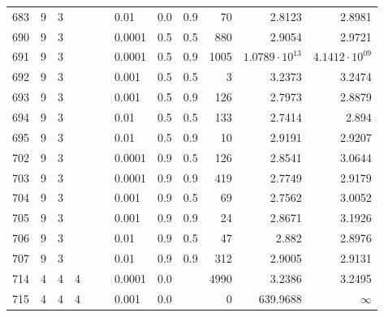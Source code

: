 \begin{longtable}{lrrrrrlrrrrr}
  683 &       9 & 3 &   &   &   &                        0.01 &      0.0 &    0.9 &      70 &                 2.8123 &                 2.8981 \\
  690 &       9 & 3 &   &   &   &                      0.0001 &      0.5 &    0.5 &     880 &                 2.9054 &                 2.9721 \\
  691 &       9 & 3 &   &   &   &                      0.0001 &      0.5 &    0.9 &    1005 &  $1.0789\cdot 10^{13}$ &  $4.1412\cdot 10^{09}$ \\
  692 &       9 & 3 &   &   &   &                       0.001 &      0.5 &    0.5 &       3 &                 3.2373 &                 3.2474 \\
  693 &       9 & 3 &   &   &   &                       0.001 &      0.5 &    0.9 &     126 &                 2.7973 &                 2.8879 \\
  694 &       9 & 3 &   &   &   &                        0.01 &      0.5 &    0.5 &     133 &                 2.7414 &                  2.894 \\
  695 &       9 & 3 &   &   &   &                        0.01 &      0.5 &    0.9 &      10 &                 2.9191 &                 2.9207 \\
  702 &       9 & 3 &   &   &   &                      0.0001 &      0.9 &    0.5 &     126 &                 2.8541 &                 3.0644 \\
  703 &       9 & 3 &   &   &   &                      0.0001 &      0.9 &    0.9 &     419 &                 2.7749 &                 2.9179 \\
  704 &       9 & 3 &   &   &   &                       0.001 &      0.9 &    0.5 &      69 &                 2.7562 &                 3.0052 \\
  705 &       9 & 3 &   &   &   &                       0.001 &      0.9 &    0.9 &      24 &                 2.8671 &                 3.1926 \\
  706 &       9 & 3 &   &   &   &                        0.01 &      0.9 &    0.5 &      47 &                  2.882 &                 2.8976 \\
  707 &       9 & 3 &   &   &   &                        0.01 &      0.9 &    0.9 &     312 &                 2.9005 &                 2.9131 \\
  714 &       4 & 4 & 4 &   &   &                      0.0001 &      0.0 &        &    4990 &                 3.2386 &                 3.2495 \\
  715 &       4 & 4 & 4 &   &   &                       0.001 &      0.0 &        &       0 &               639.9688 &               $\infty$ \\

\end{longtable}
